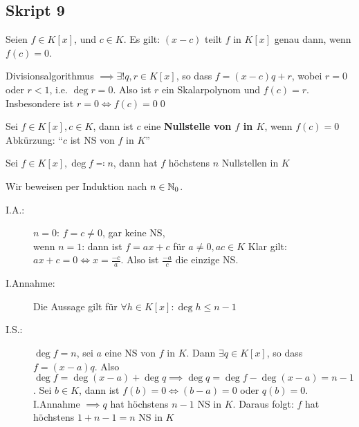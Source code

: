 \subsection{Skript 9}
\begin{subcorollary}
	Seien $ f \in K[x] $, und $ c \in K $.
	Es gilt: $ (x - c) $ teilt $ f $ in $ K[x] $ genau dann, wenn $ f(c) = 0 $.
\end{subcorollary}
\begin{subproof*}
	Divisionsalgorithmus $ \implies \exists ! q, r \in K[x] $, so dass $ f = ( x - c )q + r $, wobei $ r = 0 $ oder $ r < 1 $, i.e. $ \deg r = 0 $.
	Also ist $ r $ ein Skalarpolynom und $ f(c) = r $. Insbesondere ist $ r = 0 \iff f(c) = 0 $\qed
\end{subproof*}

\begin{subdefinition}
	Sei $ f \in K[x], c \in K $, dann ist $ c  $ eine \textbf{Nullstelle von $ f $ in $ K $}, wenn $ f(c) = 0 $
	Abkürzung: ``$ c $ ist NS von $ f $ in $ K $''
\end{subdefinition}

\begin{subcorollary}
	Sei $ f \in K[x], \deg f \eqcolon n $,
	dann hat $ f $ höchstens $ n $ Nullstellen in $ K $
\end{subcorollary}
\begin{subproof*}
	Wir beweisen per Induktion nach $ n \in \mathbb{N} _0 $.
	\begin{description}
		\item[I.A.:] $ n = 0 $: $ f = c \neq 0 $, gar keine NS,\\
			wenn $ n = 1 $: dann ist $ f = ax + c $ für $ a \neq 0, ac \in K $ Klar gilt: $ ax + c = 0 \iff x = \frac{-c}{ a }  $. Also ist $ \frac{ - a }{ c }  $ die einzige NS.
		\item[I.Annahme:] Die Aussage gilt für $ \forall h \in K[x] : \deg h \leq n - 1 $ 
		\item[I.S.:] $ \deg f = n $, sei $ a $ eine NS von $ f $ in $ K $. Dann $ \exists q \in K[x] $, so dass $  f = ( x - a ) q $.
			Also $ \deg f = \deg (x - a) + \deg q \implies \deg q = \deg f - \deg (x - a) = n - 1 $.
			Sei $ b \in K $, dann ist $ f(b) = 0 \iff (b - a) = 0 $ oder $ q(b) = 0 $.
			I.Annahme $ \implies q $ hat höchstens $ n - 1 $ NS in $ K $.
			Daraus folgt: $ f $ hat höchstens $ 1 + n - 1 = n $ NS in $ K $
	\end{description}
	
\end{subproof*}

